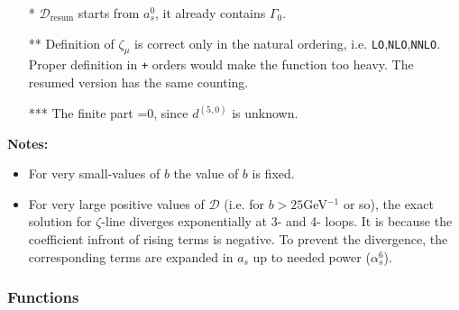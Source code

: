 \documentclass[prd,nofootinbib,eqsecnum,final]{revtex4}
\renewcommand{\(}{\left(}
\renewcommand{\)}{\right)}
\renewcommand{\[}{\left[}
\renewcommand{\]}{\right]}
\begin{document}
\begin{itemize}
\item[*] $\mathcal{D}_{\text{resum}}$ starts from $a_s^0$, it already contains $\Gamma_0$.
\item[**] Definition of $\zeta_\mu$ is correct only in the natural ordering, i.e. \texttt{LO},\texttt{NLO},\texttt{NNLO}. Proper definition in \texttt{+} orders would make the function too heavy. The resumed version has the same counting.
\item[***] The finite part =0, since $d^{(5,0)}$ is unknown.
\end{itemize}

\textbf{Notes:}
\begin{itemize}
\item For very small-values of $b$ the value of $b$ is fixed.
\item For very large positive values of $\mathcal{D}$ (i.e. for $b>25$GeV$^{-1}$ or so), the exact solution for $\zeta$-line diverges exponentially at 3- and 4- loops. It is because the coefficient infront of rising terms is negative. To prevent the divergence, the corresponding terms are expanded in $a_s$ up to needed power ($\alpha_s^6$).
\end{itemize}

\subsubsection{Functions}
\end{document}
